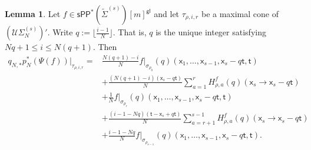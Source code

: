 \documentclass[11pt]{article}
\newcommand{\sPP}{\mathsf{sPP}}
\newcommand{\spp}{\sPP}
\theoremstyle{definition}
\newtheorem{lemma}[definition]{Lemma}
\begin{document}
\begin{lemma}\label{lem:combinat_expr_lower}
	Let $f\in \spp^{\ast}(\tilde{\Sigma}^{(s)})[m]^{\mathsf{gl}}$ and let $\tau_{\rho,i,r}$
	be a maximal cone of $(\mathcal U\Sigma_N^{(s)})'$. Write $q:=\lfloor \frac{i-1}{N}\rfloor$. That is,
	$q$ is the unique integer satisfying $Nq+1\le i\le N(q+1)$. Then
	\begin{align*}
		q_{N,\ast}p_N^{\ast}(\Psi(f))|_{\tau_{\rho,i,r}}
		={}&
		\frac{N(q+1)-i}{N}f|_{\sigma_{\rho_0}}(q)(\mathsf{x}_1,\dots,\mathsf{x}_{s-1},\mathsf{x}_s-q\mathsf{t},\mathsf{t})\\
		   &+\frac{(N(q+1)-i)(\mathsf{x}_s-q\mathsf{t})}{N}\sum_{a=1}^{r}H_{\rho,a}^f(q)(\mathsf{x}_s\to \mathsf{x}_s-q\mathsf{t})\\
		&+\frac{1}{N}f|_{\sigma_{\rho_r}}(q)(\mathsf{x}_1,\dots,\mathsf{x}_{s-1},\mathsf{x}_s-q\mathsf{t},\mathsf{t})\\
		&+\frac{(i-1-Nq)(\mathsf{t}-\mathsf{x}_s+q\mathsf{t})}{N}\sum_{a=r+1}^{s-1}H_{\rho,a}^f(q)(\mathsf{x}_s\to \mathsf{x}_s-q\mathsf{t})\\
		&+\frac{i-1-Nq}{N}f|_{\sigma_{\rho_{s-1}}}(q)(\mathsf{x}_1,\dots,\mathsf{x}_{s-1},\mathsf{x}_s-q\mathsf{t},\mathsf{t}).
	\end{align*}
\end{lemma}
\end{document}

